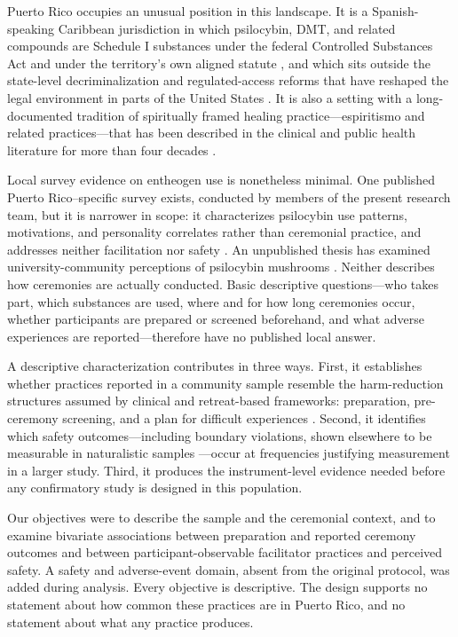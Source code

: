 \documentclass[12pt]{article}
\begin{document}
Puerto Rico occupies an unusual position in this landscape. It is a Spanish-speaking Caribbean jurisdiction
in which psilocybin, DMT, and related compounds are Schedule I substances under the federal Controlled
Substances Act \citep{uscongress1970csa} and under the territory's own aligned statute \citep{pr1971csa},
and which sits outside the state-level decriminalization and regulated-access reforms that have reshaped
the legal environment in parts of the United States \citep{siegel2023psychedelic}. It is also a setting
with a long-documented tradition of spiritually framed healing practice---espiritismo and related
practices---that has been described in the clinical and public health literature for more than four decades
\citep{koss1980therapist,comasdiaz1981puertorican,bird1981sociopsychiatry,zerrate2022espiritismo}.

Local survey evidence on entheogen use is nonetheless minimal. One published Puerto Rico--specific survey
exists, conducted by members of the present research team, but it is narrower in scope: it characterizes
psilocybin use patterns, motivations, and personality correlates rather than ceremonial practice, and
addresses neither facilitation nor safety \citep{velezrodriguez2026psilocybin}. An unpublished thesis has
examined university-community perceptions of psilocybin mushrooms \citep{doeltermorales2020hongos}. Neither
describes how ceremonies are actually conducted. Basic descriptive questions---who takes part, which
substances are used, where and for how long ceremonies occur, whether participants are prepared or screened
beforehand, and what adverse experiences are reported---therefore have no published local answer.

A descriptive characterization contributes in three ways. First, it establishes whether practices reported
in a community sample resemble the harm-reduction structures assumed by clinical and retreat-based
frameworks: preparation, pre-ceremony screening, and a plan for difficult experiences
\citep{gorman2021psychedelic,pilecki2021ethical,dutton2025harm}. Second, it identifies which safety
outcomes---including boundary violations, shown elsewhere to be measurable in naturalistic samples
\citep{kruger2025psychedelic,peluso2020reflections}---occur at frequencies justifying measurement in a
larger study. Third, it produces the instrument-level evidence needed before any confirmatory study is
designed in this population.

Our objectives were to describe the sample and the ceremonial context, and to examine bivariate
associations between preparation and reported ceremony outcomes and between participant-observable
facilitator practices and perceived safety. A safety and adverse-event domain, absent from the original
protocol, was added during analysis. Every objective is descriptive. The design supports no statement about
how common these practices are in Puerto Rico, and no statement about what any practice produces.
\end{document}
